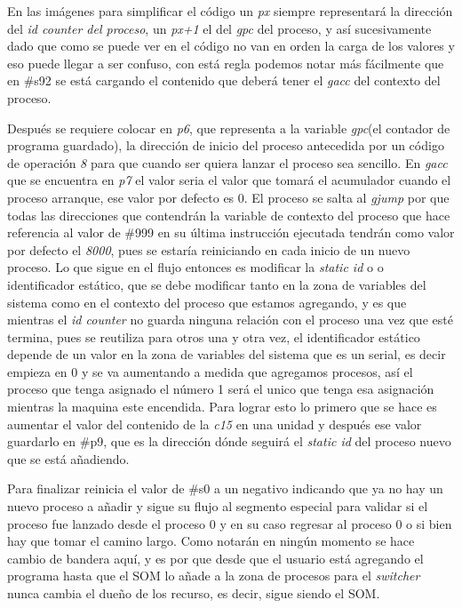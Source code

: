 \documentclass[letterpaper,12pt,oneside]{book}
\begin{document}
			En las imágenes para simplificar el código un \textit{px} siempre representará la dirección del \textit{id counter del proceso}, un
			\textit{px+1} el del \textit{gpc} del proceso, y así sucesivamente dado que como se puede ver en el código no van en orden la carga de los valores
			y eso puede llegar a ser confuso, con está regla podemos notar más fácilmente que en \#s92 se está cargando el contenido que deberá tener
			el \textit{gacc} del contexto del proceso.
			
			Después se requiere colocar en \textit{p6}, que representa a la variable \textit{gpc}(el contador de programa guardado), la dirección
			de inicio del proceso antecedida por un código de operación \textit{8} para que cuando ser quiera lanzar el proceso sea sencillo. En \textit{gacc} que
			se encuentra en \textit{p7} el valor seria el valor que tomará el acumulador cuando el proceso arranque, ese valor por defecto es 0. El proceso
			se salta al \textit{gjump} por que todas las direcciones que contendrán la variable de contexto del proceso que hace referencia
			al valor de \#999 en su última instrucción ejecutada tendrán como valor por defecto el \textit{8000}, pues se estaría reiniciando en
			cada inicio de un nuevo proceso. Lo que sigue en el flujo entonces es modificar la \textit{static id} o o identificador estático, que se debe modificar
			tanto en la zona de variables del sistema como en el contexto del proceso que estamos agregando, y es que mientras el \textit{id counter} no guarda ninguna
			relación con el proceso una vez que esté termina, pues se reutiliza para otros una y otra vez, el identificador estático depende de un valor
			en la zona de variables del sistema que es un serial, es decir empieza en 0 y se va aumentando a medida que agregamos procesos, así el proceso que
			tenga asignado el número 1 será el unico que tenga esa asignación mientras la maquina este encendida. Para lograr esto lo primero que se hace es aumentar
			el valor del contenido de la \textit{c15} en una unidad y después ese valor guardarlo en \#p9, que es la dirección dónde seguirá el \textit{static id}
			del proceso nuevo que se está añadiendo.
			
			Para finalizar reinicia el valor de \#s0 a un negativo indicando que ya no hay un nuevo proceso a añadir y sigue su flujo al segmento
			especial para validar si el proceso fue lanzado desde el proceso 0 y en su caso regresar al proceso 0 o si bien hay que tomar el camino largo.
	Como notarán en ningún momento se hace cambio de bandera aquí, y es por que desde que el usuario está agregando el programa hasta que
			el SOM lo añade a la zona de procesos para el \textit{switcher} nunca cambia el dueño de los recurso, es decir, sigue siendo el SOM.
			
\end{document}
